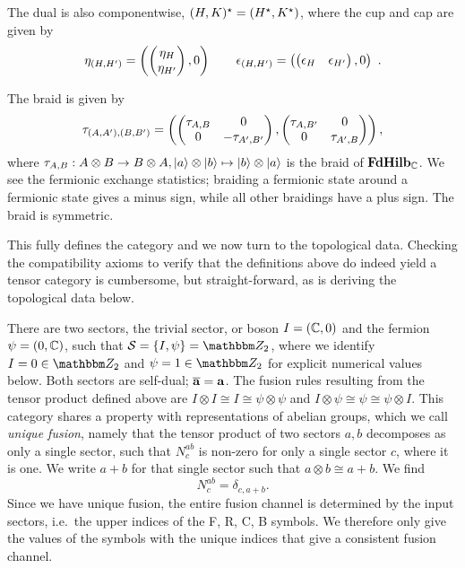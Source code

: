 The dual is also componentwise, $\dualspace{\fermpair{H}{K}} = \fermpair{\dualspace{H}}{\dualspace{K}}$, where the cup and cap are given by
\begin{equation}
    \eta_{\fermpair{H}{H'}}
    = \fermpair{\begin{pmatrix}\eta_H \\ \eta_{H'}\end{pmatrix}}{0}
    \qquad
    \epsilon_{\fermpair{H}{H'}}
    = \fermpair{\begin{pmatrix} \epsilon_H & \epsilon_{H'}\end{pmatrix}}{0}
    ~.
\end{equation}

The braid is given by
\begin{equation}
    \tau_{\fermpair{A}{A'}, \fermpair{B}{B'}}
    = \fermpair{
        \begin{pmatrix} \tau_{A,B} & 0 \\ 0 & -\tau_{A',B'} \end{pmatrix}
    }{
        \begin{pmatrix} \tau_{A,B'} & 0 \\ 0 & \tau_{A',B} \end{pmatrix}
    }
    ,
\end{equation}
where $\tau_{A,B} : A \otimes B \to B \otimes A, \ket{a} \otimes \ket{b} \mapsto \ket{b} \otimes \ket{a}$ is the braid of $\mathbf{FdHilb}_{\mathbb{C}}$.
%
We see the fermionic exchange statistics; braiding a fermionic state around a fermionic state gives a minus sign, while all other braidings have a plus sign.
%
The braid is symmetric.
%

This fully defines the category and we now turn to the topological data.
%
Checking the compatibility axioms to verify that the definitions above do indeed yield a tensor category is cumbersome, but straight-forward, as is deriving the topological data below.


There are two sectors, the trivial sector, or boson $I = \fermpair{\Cbb}{0}$ and the fermion $\psi = \fermpair{0}{\Cbb}$, such that $\mathcal{S} = \set{I, \psi} = \Zbb_2$, where we identify $I = 0 \in \Zbb_2$ and $\psi = 1 \in \Zbb_2$ for explicit numerical values below.
%
Both sectors are self-dual; $\overline{\mathbf{a}} = \mathbf{a}$.
%
The fusion rules resulting from the tensor product defined above are $I \otimes I \cong I \cong \psi \otimes \psi$ and $I \otimes \psi \cong \psi \cong \psi \otimes I$.
%
This category shares a property with representations of abelian groups, which we call \emph{unique fusion}, namely that the tensor product of two sectors $a, b$ decomposes as only a single sector, such that $N^{ab}_c$ is non-zero for only a single sector $c$, where it is one.
%
We write $a + b$ for that single sector such that $a \otimes b \cong a + b$.
%
We find
\begin{equation}
    N^{ab}_{c} = \delta_{c, a + b}
    .
\end{equation}
%
Since we have unique fusion, the entire fusion channel is determined by the input sectors, i.e.~the upper indices of the F, R, C, B symbols.
%
We therefore only give the values of the symbols with the unique indices that give a consistent fusion channel.

